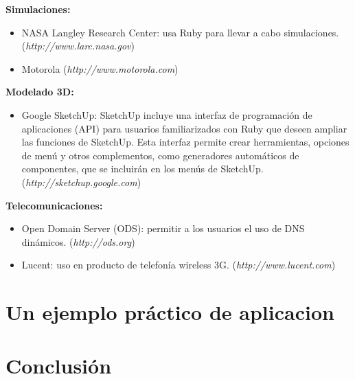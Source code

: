 \documentclass{article}
\begin{document}
\textbf{Simulaciones:}
\begin{itemize}
	\itemsep=1pt \topsep=0pt \partopsep=0pt \parskip=0pt \parsep=0pt
	\item NASA Langley Research Center: usa Ruby para llevar a cabo simulaciones. (\textit{http://www.larc.nasa.gov})
	\item Motorola (\textit{http://www.motorola.com})
\end{itemize}
\medskip

\textbf{Modelado 3D:}
\begin{itemize}
	\itemsep=1pt \topsep=0pt \partopsep=0pt \parskip=0pt \parsep=0pt
	\item Google SketchUp: SketchUp incluye una interfaz de programación de aplicaciones (API) para usuarios familiarizados con Ruby que deseen ampliar las funciones de SketchUp. Esta interfaz permite crear herramientas, opciones de menú y otros complementos, como generadores automáticos de componentes, que se incluirán en los menús de SketchUp. (\textit{http://sketchup.google.com})
\end{itemize}
\medskip

\textbf{Telecomunicaciones:}
\begin{itemize}
	\itemsep=1pt \topsep=0pt \partopsep=0pt \parskip=0pt \parsep=0pt
	\item Open Domain Server (ODS): permitir a los usuarios el uso de DNS dinámicos. (\textit{http://ods.org})
	\item Lucent: uso en producto de telefonía wireless 3G. (\textit{http://www.lucent.com})
\end{itemize}
\medskip




\section{Un ejemplo práctico de aplicacion}





\section{Conclusión}
\end{document}
